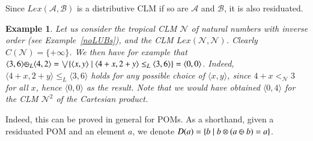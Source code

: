 \documentclass[a4paper]{elsarticle}
\newtheorem{example}{Example}
\newcommand{\1}{\mathbf{1}}
\def\odiv{{ \ominus\hspace{-8pt}:}\;}
\begin{document}
Since $Lex(\mathcal{A},\mathcal{B})$ is a distributive CLM if so are $\mathcal{A}$ and $\mathcal{B}$, it is also residuated.

\begin{example}
	Let us consider the tropical CLM $\mathcal{N}$ of natural numbers with inverse order 
	(see Example~\ref{noLUBs}),
	and the CLM $Lex(\mathcal{N},\mathcal{N})$. Clearly $C(\mathcal{N}) = \{+\infty\}$. We then have for example
	that
	$\langle 3, 6 \rangle \odiv_L \langle 4, 2 \rangle = \bigvee \{\langle x, y \rangle \mid \langle 4 + x, 2 + y \rangle \leq_L \langle 3, 6 \rangle\} = \langle 0,0 \rangle$.
	Indeed, $\langle 4 + x, 2 + y \rangle \leq_L \langle 3, 6 \rangle$ holds for any possible choice of $\langle x, y \rangle$,
	since $4 + x <_\mathcal{N} 3$ for all $x$, hence $\langle 0,0 \rangle$ as the result.
	Note that we would have obtained $\langle 0, 4 \rangle$ for the CLM $\mathcal{N}^2$ of the Cartesian product.
\end{example}

Indeed, this can be proved in general for POMs. As a shorthand, given a residuated POM 
and an element $a$, we denote $D(a) = \{ b \mid b \otimes (a \mathbin{\odiv} b) = a\}$.
\end{document}
